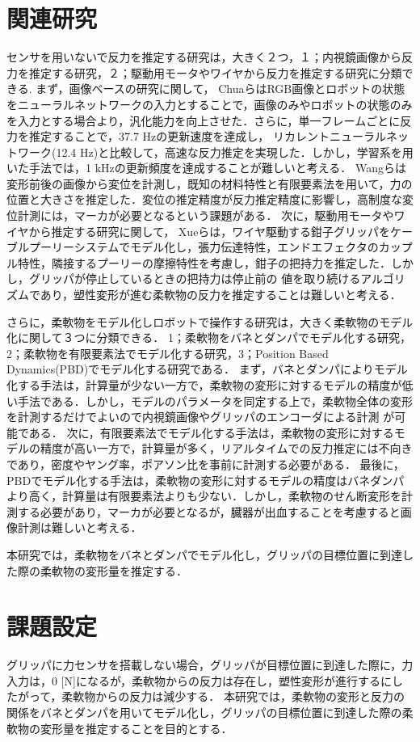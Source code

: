 \documentclass[a4paper]{jarticle}
\begin{document}
\section{関連研究}
センサを用いないで反力を推定する研究は，大きく２つ，１；内視鏡画像から反力を推定する研究，２；駆動用モータやワイヤから反力を推定する研究に分類できる.
まず，画像ベースの研究に関して，
ChuaらはRGB画像とロボットの状態をニューラルネットワークの入力とすることで，画像のみやロボットの状態のみを入力とする場合より，汎化能力を向上させた．さらに，単一フレームごとに反力を推定することで，37.7 Hzの更新速度を達成し，
リカレントニューラルネットワーク(12.4 Hz)と比較して，高速な反力推定を実現した．しかし，学習系を用いた手法では，1 kHzの更新頻度を達成することが難しいと考える．
Wangらは変形前後の画像から変位を計測し，既知の材料特性と有限要素法を用いて，力の位置と大きさを推定した．変位の推定精度が反力推定精度に影響し，高制度な変位計測には，マーカが必要となるという課題がある．
次に，駆動用モータやワイヤから推定する研究に関して，
Xueらは，ワイヤ駆動する鉗子グリッパをケーブルプーリーシステムでモデル化し，張力伝達特性，エンドエフェクタのカップル特性，隣接するプーリーの摩擦特性を考慮し，鉗子の把持力を推定した．しかし，グリッパが停止しているときの把持力は停止前の
値を取り続けるアルゴリズムであり，塑性変形が進む柔軟物の反力を推定することは難しいと考える．

さらに，柔軟物をモデル化しロボットで操作する研究は，大きく柔軟物のモデル化に関して３つに分類できる．
1；柔軟物をバネとダンパでモデル化する研究，2；柔軟物を有限要素法でモデル化する研究，3；Position Based Dynamics(PBD)でモデル化する研究である．
まず，バネとダンパによりモデル化する手法は，計算量が少ない一方で，柔軟物の変形に対するモデルの精度が低い手法である．しかし，モデルのパラメータを同定する上で，柔軟物全体の変形を計測するだけでよいので内視鏡画像やグリッパのエンコーダによる計測
が可能である．
次に，有限要素法でモデル化する手法は，柔軟物の変形に対するモデルの精度が高い一方で，計算量が多く，リアルタイムでの反力推定には不向きであり，密度やヤング率，ポアソン比を事前に計測する必要がある．
最後に，PBDでモデル化する手法は，柔軟物の変形に対するモデルの精度はバネダンパより高く，計算量は有限要素法よりも少ない．しかし，柔軟物のせん断変形を計測する必要があり，マーカが必要となるが，臓器が出血することを考慮すると画像計測は難しいと考える．

本研究では，柔軟物をバネとダンパでモデル化し，グリッパの目標位置に到達した際の柔軟物の変形量を推定する．



\section{課題設定}
グリッパに力センサを搭載しない場合，グリッパが目標位置に到達した際に，力入力は，0 [N]になるが，柔軟物からの反力は存在し，塑性変形が進行するにしたがって，柔軟物からの反力は減少する．
本研究では，柔軟物の変形と反力の関係をバネとダンパを用いてモデル化し，グリッパの目標位置に到達した際の柔軟物の変形量を推定することを目的とする．
\end{document}
